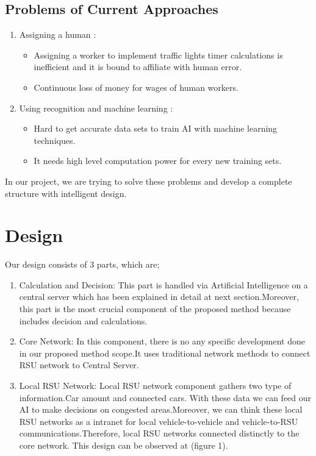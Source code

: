 \documentclass[conference]{IEEEtran}
\begin{document}
\subsection{Problems of Current Approaches}
\begin{enumerate}
	\item Assigning a human :
	      \begin{itemize}
	      	\item Assigning a worker to implement traffic lights timer calculations is inefficient and it is bound to affiliate with human error.
	      	\item Continuous loss of money for wages of human workers.
	      \end{itemize}
	\item Using recognition and machine learning :
	      \begin{itemize}
	      	\item Hard to get accurate data sets to train AI with machine learning techniques. 
	      	\item It needs high level computation power for every new training sets.
	      \end{itemize}

\end{enumerate}
In our project, we are trying to solve these problems and develop a complete structure with intelligent design.


\section{Design}
Our design consists of 3 parts, which are;
\begin{enumerate}
    \item Calculation and Decision:
    This part is handled via Artificial Intelligence on a central server which has been explained in detail at next section.Moreover, this part is the most crucial component of the proposed method because includes decision and calculations.
    \\
    \item Core Network: 
    In this component, there is no any specific development done in our proposed method scope.It uses traditional network methods to connect RSU network to Central Server.
    \\
     \item Local RSU Network: 
     Local RSU network component gathers two type of information.Car amount and connected cars.
     With these data we can feed our AI to make decisions on congested areas.Moreover, we can think these local RSU networks as a intranet for local vehicle-to-vehicle and vehicle-to-RSU communications.Therefore, local RSU networks connected distinctly to the core network.
This design can be observed at (figure 1).

\end{enumerate}
\end{document}
